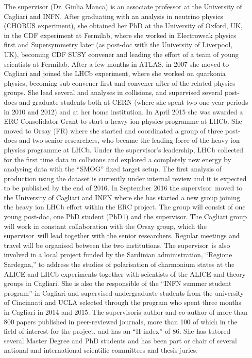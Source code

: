 \documentclass[a4paper,11pt]{article}
\newcommand{\supervisor}{the supervisor}
\newcommand{\Supervisor}{The supervisor}
\begin{document}
The supervisor (Dr. Giulia Manca) is an associate professor at the 
University of Cagliari and INFN. After graduating with an 
analysis in neutrino physics (CHORUS experiment), she obtained her 
PhD at the University of Oxford, UK, in the CDF experiment at Fermilab,
where she worked in Electroweak physics first and Supersymmetry later
(as post-doc with the University of Liverpool, UK), becoming 
CDF SUSY convener and leading the effort of a team of young scientists
at Fermilab.
After a few months in ATLAS, in 2007 she moved to Cagliari and 
joined the LHCb experiment, where she worked on quarkonia physics, 
becoming sub-convener first and convener after of the related physics groups.
She lead several \Jpsi and \PgU analyses in \pp
collisions, and supervised several post-docs and graduate 
students both at CERN (where she spent two one-year periods
in 2010 and 2012) and at her home institution. In April 2015 she
was awarded a ERC Consolidator Grant to start a heavy ion physics 
programme at LHCb. She moved to Orsay (FR) 
where she started and coordinated a group of three post-docs and 
two senior researchers, who became the leading force of the 
heavy ion physics programme at LHCb. Under \supervisor's 
leadership, LHCb collected for the first time data in \PbPb 
collisions and explored a completely new energy by analysing
data with the ``SMOG'' fixed target setup.
The first analysis of \JPsi production using the \PbPb dataset 
is currently under internal review
and it is expected to be published by the end of 2016. 
In September 2016 \supervisor\ moved to the University of Cagliari and INFN where 
she has started a new group joining the heavy ion LHCb effort within 
the ERC project. The group will consist
of one young post-doc, one PhD student (PhD1) and \supervisor. 
The Cagliari group will work 
in constant collaboration with the Orsay group, which \supervisor\
will lead together with the senior researchers. Regular meetings and 
travel will be organised between the two institutions.
\Supervisor\ is also involved in a local project funded by the 
Sardinian administration, ``Regione Sardegna,'' to address the studies of 
polarisation of charmonium states at the ALICE and LHCb experiments
together with scientists of the ALICE and theory groups in Cagliari.
She is also the responsible of the ``INFN summer student program'' in 
Cagliari and supervised undergraduate students from the 
university of Cincinnati 
and UCLA selected through the program who spent three
months in Cagliari in 2014 and 2015.
\Supervisor is author and co-author of more than 800 
papers published in peer-reviewed journals, more than 100 of which 
in the field of interest for the project, and has an ``H-index'' of 86.
She has tutored several Master Degree and PhD students and has
 been part or chair of several national
and international scientific committees and thesis juries.
\end{document}
